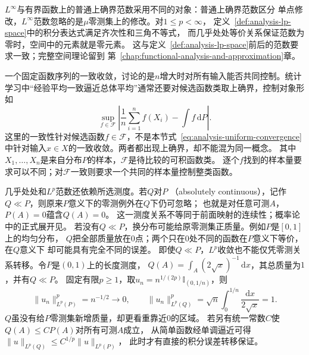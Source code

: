 $L^\infty$与有界函数上的普通上确界范数采用不同的对象：普通上确界范数区分
单点修改，$L^\infty$范数忽略的是$\mu$零测集上的修改。对$1\leq p<\infty$，
定义~\ref{def:analysis-lp-space}中的积分表达式满足齐次性和三角不等式，
而几乎处处等价关系保证范数为零时，空间中的元素就是零元素。
这与定义~\ref{def:analysis-lp-space}前后的范数要求一致；完整空间理论留到
第~\ref{chap:functional-analysis-and-approximation}章。

一个固定函数序列的一致收敛，讨论的是$n$增大时对所有输入能否共同控制。统计学习中“经验平均一致逼近总体平均”通常还要对候选函数类取上确界，控制对象形如
\[   \sup_{f\in\mathcal{F}}   \left|     \frac1n\sum_{i=1}^nf(X_i)-\int f\,\mathrm{d}P   \right|. \]
这里的一致性针对候选函数$f\in\mathcal{F}$，不是本节式~\eqref{eq:analysis-uniform-convergence}中针对输入$x\in X$的一致收敛。两者都出现上确界，却不能混为同一概念。
其中$X_1,\ldots,X_n$是来自分布$P$的样本，$\mathcal F$是待比较的可积函数类。
逐个$f$找到的样本量要求可以不同；对$\mathcal F$一致则要求一个共同的样本量控制整类函数。

几乎处处和$L^p$范数还依赖所选测度。若$Q$对$P$
（absolutely continuous），记作$Q\ll P$，则原来$P$意义下的零测例外在$Q$下仍可忽略；
也就是对任意可测$A$，$P(A)=0$蕴含$Q(A)=0$。
这一测度关系不等同于前面映射的连续性；概率论中的正式展开见。
若没有$Q\ll P$，换分布可能给原零测集正质量。例如$P$是$[0,1]$上的均匀分布，
$Q$把全部质量放在$0$点；两个只在$0$处不同的函数在$P$意义下等价，在$Q$意义下
却可能具有完全不同的误差。
即使$Q\ll P$，$L^p$收敛也不能仅凭零测关系转移。令$P$是$(0,1)$上的长度测度，
$Q(A)=\int_A(2\sqrt x)^{-1}\,\mathrm dx$，其总质量为$1$，并有$Q\ll P$。
固定有限$p\geq1$，取$u_n=n^{1/(2p)}\mathbb I_{(0,1/n)}$，则
\[
 \lVert u_n\rVert_{L^p(P)}^p=n^{-1/2}\to0,\qquad
 \lVert u_n\rVert_{L^p(Q)}^p
 =\sqrt n\int_0^{1/n}\frac{\mathrm dx}{2\sqrt x}=1.
\]
$Q$虽没有给$P$零测集新增质量，却更看重靠近$0$的区域。
若另有统一常数$C$使$Q(A)\leq CP(A)$对所有可测$A$成立，
从简单函数经单调逼近可得$\lVert u\rVert_{L^p(Q)}
\leq C^{1/p}\lVert u\rVert_{L^p(P)}$，
此时才有直接的积分误差转移保证。

